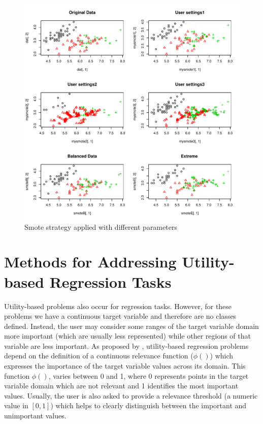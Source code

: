 \documentclass[10pt,a4paper]{article}\usepackage[]{graphicx}\usepackage[]{color}
\makeatletter
\def\maxwidth{ %
  \ifdim\Gin@nat@width>\linewidth
    \linewidth
  \else
    \Gin@nat@width
  \fi
}
\newenvironment{knitrout}{}{} %
\makeatother
\begin{document}
\begin{knitrout}\footnotesize
{}\color{fgcolor}\begin{figure}

{\centering \includegraphics[width=\maxwidth]{figures/UBL-smote_plot-1} 

}

\caption[Smote strategy applied with different parameters]{Smote strategy applied with different parameters}\label{fig:smote_plot}
\end{figure}


\end{knitrout}


\section{Methods for Addressing Utility-based Regression Tasks}\label{sec:methRegres}

Utility-based problems also occur for regression tasks. However, for these problems we have a continuous target variable and therefore are no classes defined. Instead, the user may consider some ranges of the target variable domain more important (which are usually less represented) while other regions of that variable are less important. As proposed by \cite{torgo2007utility, ribeiro2011utility}, utility-based regression problems depend on the definition of a continuous relevance function ($\phi()$) which expresses the importance of the target variable values across its domain. This function $\phi()$, varies between 0 and 1, where 0 represents points in the target variable domain which are not relevant and 1 identifies the most important values. Usually, the user is also asked to provide a relevance threshold (a numeric value in $[0,1]$) which helps to clearly distinguish between the important and unimportant values.
\end{document}
